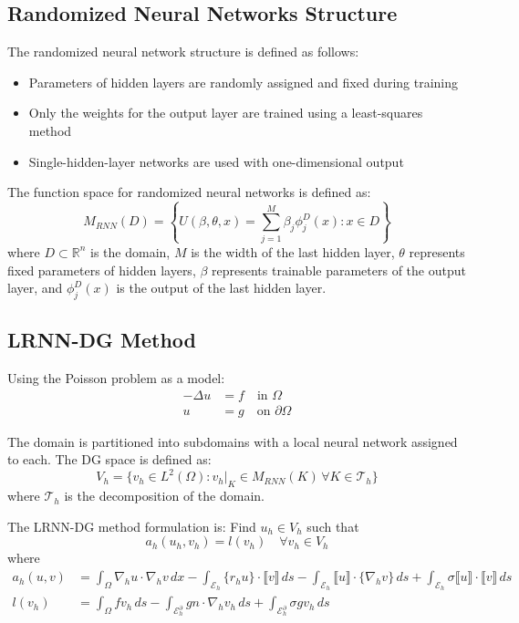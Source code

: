 \documentclass[11pt,a4paper]{article}
\begin{document}
\subsection{Randomized Neural Networks Structure}

The randomized neural network structure is defined as follows:
\begin{itemize}
    \item Parameters of hidden layers are randomly assigned and fixed during training
    \item Only the weights for the output layer are trained using a least-squares method
    \item Single-hidden-layer networks are used with one-dimensional output
\end{itemize}

The function space for randomized neural networks is defined as:
\begin{equation}
M_{RNN}(D) = \left\{U(\beta, \theta, x) = \sum_{j=1}^{M} \beta_j \phi_j^D(x) : x \in D\right\}
\end{equation}
where $D \subset \mathbb{R}^n$ is the domain, $M$ is the width of the last hidden layer, $\theta$ represents fixed parameters of hidden layers, $\beta$ represents trainable parameters of the output layer, and $\phi^D_j(x)$ is the output of the last hidden layer.

\subsection{LRNN-DG Method}

Using the Poisson problem as a model:
\begin{align}
-\Delta u &= f \quad \text{in } \Omega \\
u &= g \quad \text{on } \partial\Omega
\end{align}

The domain is partitioned into subdomains with a local neural network assigned to each. The DG space is defined as:
\begin{equation}
V_h = \{v_h \in L^2(\Omega) : v_h|_K \in M_{RNN}(K) \, \forall K \in \mathcal{T}_h\}
\end{equation}
where $\mathcal{T}_h$ is the decomposition of the domain.

The LRNN-DG method formulation is: Find $u_h \in V_h$ such that
\begin{equation}
a_h(u_h, v_h) = l(v_h) \quad \forall v_h \in V_h
\end{equation}
where
\begin{align}
a_h(u, v) &= \int_{\Omega} \nabla_h u \cdot \nabla_h v \, dx - \int_{\mathcal{E}_h} \{r_h u\} \cdot \llbracket v \rrbracket \, ds - \int_{\mathcal{E}_h} \llbracket u \rrbracket \cdot \{\nabla_h v\} \, ds + \int_{\mathcal{E}_h} \sigma \llbracket u \rrbracket \cdot \llbracket v \rrbracket \, ds\\
l(v_h) &= \int_{\Omega} f v_h \, ds - \int_{\mathcal{E}_h^{\partial}} g n \cdot \nabla_h v_h \, ds + \int_{\mathcal{E}_h^{\partial}} \sigma g v_h \, ds
\end{align}
\end{document}
